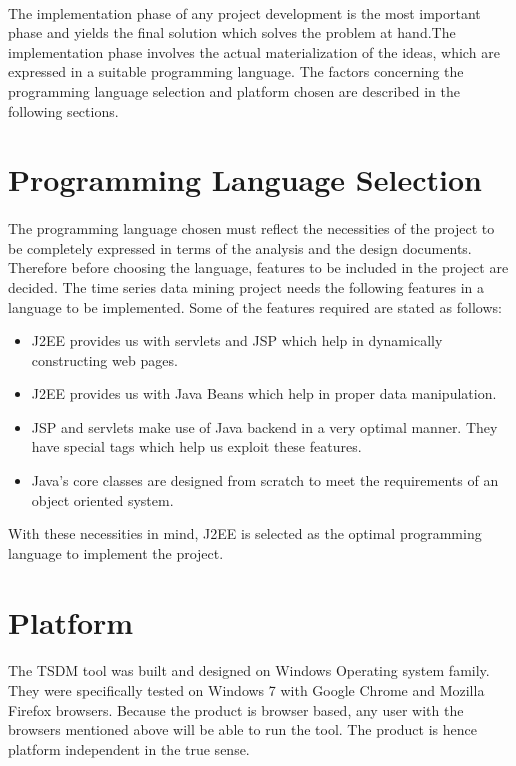 \documentclass[12pt,a4paper]{report}
\begin{document}
\paragraph{}The implementation phase of any project development is the most important phase and yields the final solution which solves the problem at hand.The implementation phase involves the actual materialization of the ideas, which are expressed in a suitable programming language. The factors concerning the programming language selection and platform chosen are described in the following sections.
\section{Programming Language Selection}

\paragraph{}The programming language chosen must reflect the necessities of the project to be completely expressed in terms of the analysis and the design documents. Therefore before choosing the language, features to be included in the project are decided. The time series data mining project needs the following features in a language to be implemented. Some of the features required are stated as follows:
\begin{itemize}
\item J2EE provides us with servlets and JSP which help in dynamically constructing web pages.
\item J2EE provides us with Java Beans which help in proper data manipulation.
\item JSP and servlets make use of Java backend in a very optimal manner. They have special tags which help us exploit these features.
\item Java's core classes are designed from scratch to meet the requirements of an object oriented system.
\end{itemize} 
With these necessities in mind, J2EE is selected as the optimal programming language to implement the project.
\section{Platform}
\paragraph{}The TSDM tool was built and designed on Windows Operating system family. They were specifically tested on Windows 7 with Google Chrome and Mozilla Firefox browsers. Because the product is browser based, any user with the browsers mentioned above will be able to run the tool. The product is hence platform independent in the true sense.
\end{document}
